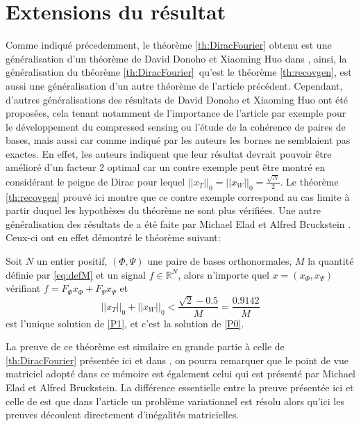 \section{Extensions du résultat}
Comme indiqué précedemment, le théorème \ref{th:DiracFourier} obtenu est une généralisation d'un théorème de David Donoho et Xiaoming Huo dans \cite{DonohoHuo}, ainsi, la généralisation du théorème \ref{th:DiracFourier} qu'est le théorème \ref{th:recovgen}, est aussi une généralisation d'un autre théorème de l'article précédent.
\newline
Cependant, d'autres généralisations des résultats de David Donoho et Xiaoming Huo ont été proposées, cela tenant notamment de l'importance de l'article par exemple pour le développement du compressed sensing ou l'étude de la cohérence de paires de bases, mais aussi car comme indiqué par les auteurs les bornes ne semblaient pas exactes.
\newline
En effet, les auteurs indiquent que leur résultat devrait pouvoir être amélioré d'un facteur 2 optimal car un contre exemple peut être montré en considérant le peigne de Dirac pour lequel $||x_T||_0 = ||x_W||_0 = \frac{\sqrt{N}}{2}$.
Le théorème \ref{th:recovgen} prouvé ici montre que ce contre exemple correspond au cas limite à partir duquel les hypothèses du théorème ne sont plus vérifiées.
\newline
Une autre généralisation des résultats de \cite{DonohoHuo} a été faite par Michael Elad et Alfred Bruckstein \cite{eladBruckstein}. Ceux-ci ont en effet démontré le théorème suivant:
\begin{theoreme}\label{th:eladbruc}
	Soit $N$ un entier positif, $(\Phi, \Psi)$ une paire de bases orthonormales, $M$ la quantité définie par \ref{eq:defM} et un signal $f\in \mathbb{R}^N$, alors n'importe quel $x = (x_\Phi, x_\Psi)$ vérifiant $f = F_\Phi x_\Phi + F_\Psi x_\Psi$ et
	\begin{equation}
		||x_T||_0 + ||x_W||_0 < \frac{\sqrt{2} -0.5}{M} = \frac{0.9142}{M}
	\end{equation}
	est l'unique solution de \ref{P1}, et c'est la solution de \ref{P0}.
\end{theoreme}
La preuve de ce théorème est similaire en grande partie à celle de \ref{th:DiracFourier} présentée ici et dans \cite{DonohoHuo}, on pourra remarquer que le point de vue matriciel adopté dans ce mémoire est également celui qui est présenté par Michael Elad et Alfred Bruckstein.
La différence essentielle entre la preuve présentée ici et celle de \cite{eladBruckstein} est que dans l'article un problème variationnel est résolu alors qu'ici les preuves découlent directement d'inégalités matricielles. 
